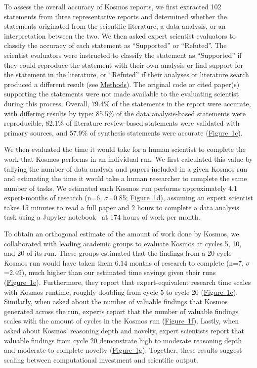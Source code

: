 \documentclass{article}
\begin{document}
To assess the overall accuracy of Kosmos reports, we first extracted 102 statements from three representative reports and determined whether the statements originated from the scientific literature, a data analysis, or an interpretation between the two. We then asked expert scientist evaluators to classify the accuracy of each statement as “Supported” or “Refuted”. The scientist evaluators were instructed to classify the statement as “Supported” if they could reproduce the statement with their own analysis or find support for the statement in the literature, or “Refuted” if their analyses or literature search produced a different result (see \hyperref[sec:methods]{Methods}). The original code or cited paper(s) supporting the statements were not made available to the evaluating scientist during this process. Overall, 79.4\% of the statements in the report were accurate, with differing results by type: 85.5\% of the data analysis-based statements were reproducible, 82.1\% of literature review-based statements were validated with primary sources, and 57.9\% of synthesis statements were accurate (\hyperref[fig:fig1]{Figure~1c}).

We then evaluated the time it would take for a human scientist to complete the work that Kosmos performs in an individual run. We first calculated this value by tallying the number of data analysis and papers included in a given Kosmos run and estimating the time it would take a human researcher to complete the same number of tasks. We estimated each Kosmos run performs approximately 4.1 expert-months of research (n=6, $\sigma$=0.85; \hyperref[fig:fig1]{Figure~1d}), assuming an expert scientist takes 15 minutes to read a full paper and 2 hours to complete a data analysis task using a Jupyter notebook~\cite{kwa_measuring_2025} at 174 hours of work per month.

To obtain an orthogonal estimate of the amount of work done by Kosmos, we collaborated with leading academic groups to evaluate Kosmos at cycles 5, 10, and 20 of its run. These groups estimated that the findings from a 20-cycle Kosmos run would have taken them 6.14 months of research to complete (n=7, $\sigma$=2.49), much higher than our estimated time savings given their runs (\hyperref[fig:fig1]{Figure~1e}). Furthermore, they report that expert-equivalent research time scales with Kosmos runtime, roughly doubling from cycle 5 to cycle 20 (\hyperref[fig:fig1]{Figure~1e}). Similarly, when asked about the number of valuable findings that Kosmos generated across the run, experts report that the number of valuable findings scales with the amount of cycles in the Kosmos run (\hyperref[fig:fig1]{Figure~1f}). Lastly, when asked about Kosmos' reasoning depth and novelty, expert scientists report that valuable findings from cycle 20 demonstrate high to moderate reasoning depth and moderate to complete novelty (\hyperref[fig:fig1]{Figure~1g}). Together, these results suggest scaling between computational investment and scientific output.
\end{document}

